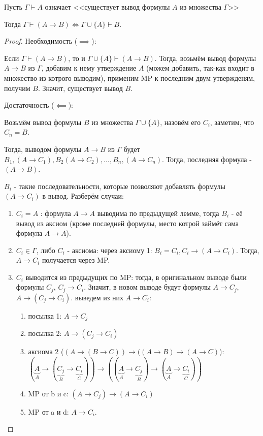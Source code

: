 \begin{lemma}[О дедукции (DT)] \label{logic_DT} \thmslashn

    Пусть $\Gamma \vdash A$ означает <<существует вывод формулы $A$ из множества $\Gamma$>>

    Тогда $\Gamma \vdash (A \to B) \iff \Gamma \cup \{A\} \vdash B $.
    \begin{proof} \thmslashn
    
        Необходимость ($\implies$):

        Если $\Gamma \vdash (A \to B)$, то и $\Gamma \cup \{A\} \vdash (A \to B) $. Тогда, возьмём вывод формулы $A \to B$ из $\Gamma$, добавим к нему утверждение $A$ (можем добавить, так-как входит в множество из котрого выводим), применим MP к последним двум утвержденям, получим $B$. Значит, существует вывод $B$.

        Достаточность ($\impliedby$):

        Возьмём вывод формулы $B$ из множества $\Gamma \cup \{A\}$, назовём его $C_{i}$, заметим, что $C_{n} = B$.

        Тогда, выводом формулы $A \to B$ из $\Gamma$ будет $B_1, (A \to C_1), B_2 (A \to  C_2), \ldots, B_{n}, (A \to C_{n})$. Тогда, последняя формула - $(A \to B)$.

        $B_{i}$ - такие последовательности, которые позволяют добавлять формулы $(A \to C_{i})$ в вывод. Разберём случаи:

        \begin{enumerate}
            \item $C_{i} = A$ : формула $A \to A$ выводима по предыдущей лемме, тогда $B_{i}$ - её вывод из аксиом (кроме последней формулы, место котрой займёт сама формула $A \to A$).
            \item $C_{i}\in \Gamma$, либо $C_{i}$ - аксиома: через аксиому 1: $B_{i} = C_{i}, C_{i} \to (A \to C_{i})$. Тогда, $A \to C_{i}$ получается через MP.
            \item $C_{i}$ выводится из предыдущих по MP: тогда, в оригинальном выводе были формулы $C_{j}$, $C_{j} \to C_{i}$. Значит, в новом выводе будут формулы $A \to C_{j}$, $A \to (C_{j} \to C_{i})$. выведем из них $A \to C_{i}$:
                \begin{enumerate}
                    \item посылка 1: $A \to C_{j}$
                    \item посылка 2: $A \to (C_{j} \to C_{i})$
                    \item аксиома 2 ($(A \to (B \to C)) \to ((A \to B) \to (A \to C)$):\\
                        $(\underbrace{A}_{A} \to (\underbrace{C_{j}}_{B} \to \underbrace{C_{i}}_{C})) \to ((\underbrace{A}_{A} \to \underbrace{C_{j}}_{B}) \to (\underbrace{A}_{A} \to \underbrace{C_{i}}_{C}))$
                    \item MP от b и c: $(A \to C_{j}) \to (A \to C_{i})$
                    \item MP от a и d: $A \to C_{i}$.
                \end{enumerate}


\end{enumerate}
\end{proof}
\end{lemma}
